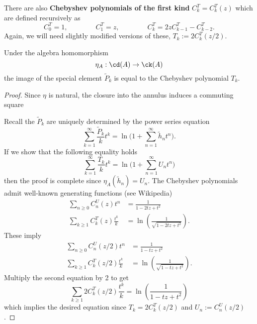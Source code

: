 There are also \textbf{Chebyshev polynomials of the first kind} $C^T_k = C^T_k(z)$ which are defined recursively as
\[
C^T_0 = 1, \qquad \qquad C^T_1 = z, \qquad \qquad C^T_k = 2 z C^T_{k-1} - C^T_{k-2}.
\]
Again, we will need slightly modified versions of these, $T_k := 2C^T_k(z/2)$.  

\begin{proposition}
Under the algebra homomorphism
\[
\eta_A: \cd(A) \to \ck(A)
\]
the image of the special element $\tilde{P}_k$ is equal to the Chebyshev polynomial $T_k$.
\end{proposition}
\begin{proof}
Since $\eta$ is natural, the closure into the annulus induces a commuting square
\begin{center}
\end{center}
Recall the $\tilde{P}_k$ are uniquely determined by the power series equation
\[
\sum_{k=1}^\infty \frac{\tilde{P}_k}{k} t^k = \ln \Bigg( 1 + \sum_{n=1}^\infty \tilde{h}_n t^n \Bigg).
\]
If we show that the following equality holds
\[
\sum_{k=1}^\infty \frac{T_k}{k} t^k = \ln \Bigg( 1 + \sum_{n=1}^\infty U_n t^n \Bigg)
\]
then the proof is complete since $\eta_A(\tilde{h}_n)=U_n$. The Chebyshev polynomials admit well-known generating functions (see Wikipedia)
\begin{align*}
\sum_{n \geq 0} C_n^U(z)t^n &= \frac{1}{1-2tz+t^2} \\
\sum_{k \geq 1} C_k^T(z)\frac{t^k}{k} &= \ln \left( \frac{1}{\sqrt{1-2tz+t^2}} \right).
\end{align*}
These imply
\begin{align*}
\sum_{n \geq 0} C_n^U(z/2)t^n &= \frac{1}{1-tz+t^2} \\
\sum_{k \geq 1} C_k^T(z/2)\frac{t^k}{k} &= \ln \left( \frac{1}{\sqrt{1-tz+t^2}} \right).
\end{align*}
Multiply the second equation by 2 to get
\[
\sum_{k \geq 1} 2C_k^T(z/2)\frac{t^k}{k} = \ln \left( \frac{1}{1-tz+t^2} \right)
\]
which implies the desired equation since $T_k = 2C_k^T(z/2)$ and $U_n := C_n^U(z/2)$.
\end{proof}

